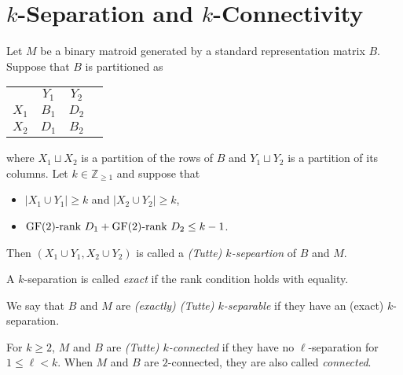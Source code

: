\section{$k$-Separation and $k$-Connectivity}

\begin{definition}[$k$-separation]
  \label{def:code_k_sep}
  Let $M$ be a binary matroid generated by a standard representation matrix $B$. Suppose that $B$ is partitioned as
  \begin{tabular}{cccc}
                                 & $Y_{1}$                      & $Y_{2}$                      &  \\ \cline{2-3}
    \multicolumn{1}{c|}{$X_{1}$} & \multicolumn{1}{c|}{$B_{1}$} & \multicolumn{1}{c|}{$D_{2}$} &  \\ \cline{2-3}
    \multicolumn{1}{c|}{$X_{2}$} & \multicolumn{1}{c|}{$D_{1}$} & \multicolumn{1}{c|}{$B_{2}$} &  \\ \cline{2-3}
  \end{tabular}
  where $X_{1} \sqcup X_{2}$ is a partition of the rows of $B$ and $Y_{1} \sqcup Y_{2}$ is a partition of its columns.
  Let $k \in \mathbb{Z}_{\geq 1}$ and suppose that
  \begin{itemize}
    \item $\left| X_{1} \cup Y_{1} \right| \geq k$ and $\left| X_{2} \cup Y_{2} \right| \geq k$,
    \item $\mathrm{GF}(2) \text{-rank } D_{1} + \mathrm{GF}(2) \text{-rank } D_{2} \leq k - 1$.
  \end{itemize}
  Then $\left( X_{1} \cup Y_{1}, X_{2} \cup Y_{2} \right)$ is called a \emph{(Tutte) $k$-sepeartion} of $B$ and $M$.
\end{definition}

\begin{definition}
  \label{def:code_exact_k_sep}
  A $k$-separation is called \emph{exact} if the rank condition holds with equality.
\end{definition}

\begin{definition}[$k$-separability]
  \label{def:code_k_separability}
  We say that $B$ and $M$ are \emph{(exactly) (Tutte) $k$-separable} if they have an (exact) $k$-separation.
\end{definition}

\begin{definition}[$k$-connectivity]
  \label{def:code_k_conn}
  For $k \ge 2$, $M$ and $B$ are \emph{(Tutte) $k$-connected} if they have no $\ell$-separation for $1 \leq \ell < k$.
  When $M$ and $B$ are $2$-connected, they are also called \emph{connected}.
\end{definition}
